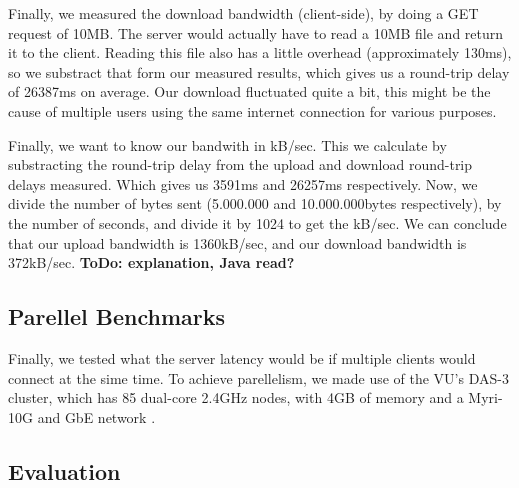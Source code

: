 Finally, we measured the download bandwidth (client-side), by doing a GET
request of 10MB. The server would actually have to read a 10MB file and return
it to the client. Reading this file also has a little overhead (approximately
130ms), so we substract that form our measured results, which gives us a
round-trip delay of 26387ms on average. Our download fluctuated quite a bit,
this might be the cause of multiple users using the same internet connection
for various purposes.

Finally, we want to know our bandwith in kB/sec. This we calculate by
substracting the round-trip delay from the upload and download round-trip delays
measured. Which gives us 3591ms and 26257ms respectively. Now, we divide the
number of bytes sent (5.000.000 and 10.000.000bytes respectively), by the number
of seconds, and divide it by 1024 to get the kB/sec. We can conclude that our
upload bandwidth is 1360kB/sec, and our download bandwidth is 372kB/sec.
\textbf{ToDo: explanation, Java read?}

\subsection{Parellel Benchmarks}
Finally, we tested what the server latency would be if multiple clients would
connect at the sime time. To achieve parellelism, we made use of the VU's DAS-3
cluster, which has 85 dual-core 2.4GHz nodes, with 4GB of memory and a Myri-10G
and GbE network \cite{das3-www}.

\subsection{Evaluation}
